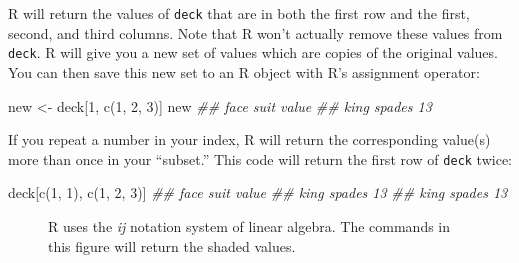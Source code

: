 \documentclass[
  letterpaper,
  DIV=11,
  numbers=noendperiod]{scrbook}
\makeatletter
\newenvironment{Shaded}{\begin{snugshade}}{\end{snugshade}}
\newcommand{\DecValTok}[1]{\textcolor[rgb]{0.68,0.00,0.00}{#1}}
\newcommand{\DocumentationTok}[1]{\textcolor[rgb]{0.37,0.37,0.37}{\textit{#1}}}
\newcommand{\FunctionTok}[1]{\textcolor[rgb]{0.28,0.35,0.67}{#1}}
\newcommand{\NormalTok}[1]{\textcolor[rgb]{0.00,0.23,0.31}{#1}}
\newcommand{\OtherTok}[1]{\textcolor[rgb]{0.00,0.23,0.31}{#1}}
\newcommand*\pandocbounded[1]{%
  \sbox\pandoc@box{#1}%
  \Gscale@div\@tempa{\textheight}{\dimexpr\ht\pandoc@box+\dp\pandoc@box\relax}%
  \Gscale@div\@tempb{\linewidth}{\wd\pandoc@box}%
  \ifdim\@tempb\p@<\@tempa\p@\let\@tempa\@tempb\fi%
  \ifdim\@tempa\p@<\p@\scalebox{\@tempa}{\usebox\pandoc@box}%
  \else\usebox{\pandoc@box}%
  \fi%
}
\makeatother
\begin{document}
R will return the values of \texttt{deck} that are in both the first row
and the first, second, and third columns. Note that R won't actually
remove these values from \texttt{deck}. R will give you a new set of
values which are copies of the original values. You can then save this
new set to an R object with R's assignment operator:

\begin{Shaded}
\begin{Highlighting}[]
\NormalTok{new }\OtherTok{\textless{}{-}}\NormalTok{ deck[}\DecValTok{1}\NormalTok{, }\FunctionTok{c}\NormalTok{(}\DecValTok{1}\NormalTok{, }\DecValTok{2}\NormalTok{, }\DecValTok{3}\NormalTok{)]}
\NormalTok{new}
\DocumentationTok{\#\# face   suit value}
\DocumentationTok{\#\# king spades    13}
\end{Highlighting}
\end{Shaded}

\begin{tcolorbox}[enhanced jigsaw, breakable, colback=white, colbacktitle=quarto-callout-tip-color!10!white, arc=.35mm, bottomrule=.15mm, coltitle=black, left=2mm, rightrule=.15mm, colframe=quarto-callout-tip-color-frame, leftrule=.75mm, opacitybacktitle=0.6, bottomtitle=1mm, toptitle=1mm, titlerule=0mm, opacityback=0, title=\textcolor{quarto-callout-tip-color}{\faLightbulb}\hspace{0.5em}{Repetition}, toprule=.15mm]

If you repeat a number in your index, R will return the corresponding
value(s) more than once in your ``subset.'' This code will return the
first row of \texttt{deck} twice:

\begin{Shaded}
\begin{Highlighting}[]
\NormalTok{deck[}\FunctionTok{c}\NormalTok{(}\DecValTok{1}\NormalTok{, }\DecValTok{1}\NormalTok{), }\FunctionTok{c}\NormalTok{(}\DecValTok{1}\NormalTok{, }\DecValTok{2}\NormalTok{, }\DecValTok{3}\NormalTok{)]}
\DocumentationTok{\#\# face   suit value}
\DocumentationTok{\#\# king spades    13}
\DocumentationTok{\#\# king spades    13}
\end{Highlighting}
\end{Shaded}

\end{tcolorbox}

\begin{figure}

\centering{

\pandocbounded{\texttt{[image: images/hopr\_0401.png]}}

}

\caption{\label{fig-positive}R uses the \emph{ij} notation system of
linear algebra. The commands in this figure will return the shaded
values.}

\end{figure}%
\end{document}
